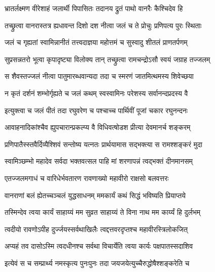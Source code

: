 \twolineshloka
{भ्रातर्लक्ष्मण वीरेशाहं जलार्थी पिपासितः}
{तदानय द्रुतं पाथो वानरैः कैश्चिदेव हि} %


\twolineshloka
{तच्छ्रुत्वा वानरास्तत्र ह्यधावन्त दिशो दश} 
{नीत्वा जलं च ते प्रोचुः प्रणिपत्य पुरः स्थिताः} %


\twolineshloka
{जलं च गृह्यतां स्वामिन्नानीतं तत्त्वदाज्ञया}
{महोत्तमं च सुस्वादु शीतलं प्राणतर्पणम्} %


\twolineshloka
{सुप्रसन्नतरो भूत्वा कृपादृष्ट्या विलोक्य तान् }
{तच्छ्रुत्वा रामचन्द्रोऽसौ स्वयं जग्राह तज्जलम्} %

\twolineshloka
{स शैवस्तज्जलं नीत्वा पातुमारब्धवान्यदा} 
{तदा च स्मरणं जातमित्थमस्य शिवेच्छया} %

\twolineshloka
{न कृतं दर्शनं शम्भोर्गृह्यते च जलं कथम्}
{स्वस्वामिनः परेशस्य सर्वानन्दप्रदस्य वै} %

\twolineshloka
{इत्युक्त्वा च जलं पीतं तदा रघुवरेण च}
{पश्चाच्च पार्थिवीं पूजां चकार रघुनन्दनः} %

\twolineshloka
{आवाहनादिकांश्चैव ह्युपचारान्प्रकल्प्य वै}
{विधिवत्षोडश प्रीत्या देवमानर्च शङ्करम्} %

\twolineshloka
{प्रणिपातैस्स्तवैर्दिव्यैश्शिवं सन्तोष्य यत्नतः}
{प्रार्थयामास सद्भक्त्या स रामश्शङ्करं मुदा} %


\twolineshloka
{स्वामिञ्छम्भो महादेव सर्वदा भक्तवत्सल} 
{पाहि मां शरणापन्नं त्वद्भक्तं दीनमानसम्} %

\twolineshloka
{एतज्जलमगाधं च वारिधेर्भवतारण}
{रावणाख्यो महावीरो राक्षसो बलवत्तरः} %

\twolineshloka
{वानराणां बलं ह्येतच्चञ्चलं युद्धसाधनम्}
{ममकार्यं कथं सिद्धं भविष्यति प्रियाप्तये} %

\twolineshloka
{तस्मिन्देव त्वया कार्यं साहाय्यं मम सुव्रत} 
{साहाय्यं ते विना नाथ मम कार्य्यं हि दुर्लभम्} %

\twolineshloka
{त्वदीयो रावणोऽपीह दुर्ज्जयस्सर्वथाखिलैः} 
{त्वद्दत्तवरदृप्तश्च महावीरस्त्रिलोकजित्} %

\twolineshloka
{अप्यहं तव दासोऽस्मि त्वदधीनश्च सर्वथा} 
{विचार्येति त्वया कार्यः पक्षपातस्सदाशिव} %


\twolineshloka
{इत्येवं स च सम्प्रार्थ्य नमस्कृत्य पुनःपुनः} 
{तदा जयजयेत्युच्चैरुद्धोषैश्शङ्करेति च} %

